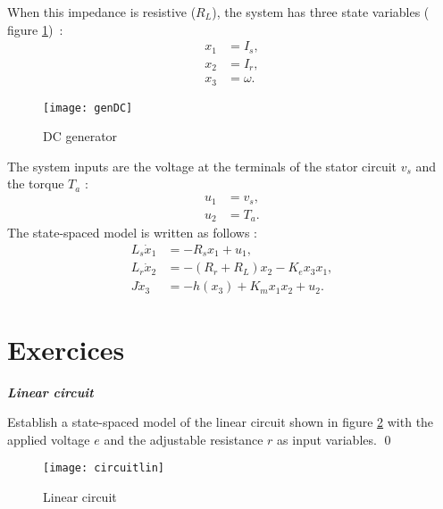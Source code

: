 When this impedance is resistive ($R_L$),  the system has three state variables ( figure
\ref{fig:genDC})~: 
\begin{equation*} \begin{split} 
x_1 &= I_s, \\ x_2 &= I_r, \\ x_3 &= \omega.
\end{split} \end{equation*}
\begin{figure}[htbp]
\begin{center}
\texttt{[image: genDC]}
\caption{ DC generator}
\label{fig:genDC}
\end{center}
\end{figure}
The system inputs are the voltage at the terminals of the stator circuit $v_s$ and the torque $T_a$ :
\begin{equation*} \begin{split}
u_1 &= v_s, \\
u_2 &= T_a.
\end{split} \end{equation*}
The state-spaced model is written as follows :
\begin{equation*} \begin{split}
L_s\dot x_1 &= -R_s x_1+ u_1, \\
L_r\dot x_2 &=  - (R_r +R_L) x_2 - K_e x_3 x_1,\\
J\dot x_3 &= -h(x_3) + K_m x_1x_2 + u_2.
\end{split} \end{equation*}


\section{Exercices}

\begin{exercice} {\bf \em Linear circuit}

Establish a state-spaced model of the linear circuit shown in figure  \ref{fig:circuitlin} with the applied voltage $e$ and the adjustable resistance $r$ as input variables. \qed
 \begin{figure}[htbp]
\begin{center}
\texttt{[image: circuitlin]}
\caption{Linear circuit}
\label{fig:circuitlin}
\end{center}
\end{figure}

\end{exercice}
\vv


